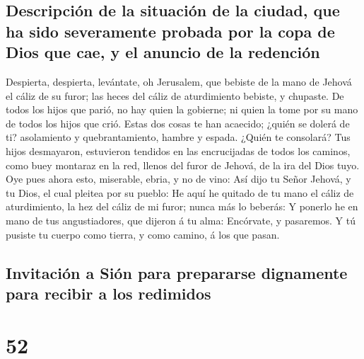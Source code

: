 \hypertarget{descripciuxf3n-de-la-situaciuxf3n-de-la-ciudad-que-ha-sido-severamente-probada-por-la-copa-de-dios-que-cae-y-el-anuncio-de-la-redenciuxf3n}{%
\subsection{Descripción de la situación de la ciudad, que ha sido
severamente probada por la copa de Dios que cae, y el anuncio de la
redención}\label{descripciuxf3n-de-la-situaciuxf3n-de-la-ciudad-que-ha-sido-severamente-probada-por-la-copa-de-dios-que-cae-y-el-anuncio-de-la-redenciuxf3n}}

 Despierta, despierta, levántate, oh Jerusalem, que
bebiste de la mano de Jehová el cáliz de su furor; las heces del cáliz
de aturdimiento bebiste, y chupaste.  De todos los hijos
que parió, no hay quien la gobierne; ni quien la tome por su mano de
todos los hijos que crió.  Estas dos cosas te han
acaecido; ¿quién se dolerá de ti? asolamiento y quebrantamiento, hambre
y espada. ¿Quién te consolará?  Tus hijos desmayaron,
estuvieron tendidos en las encrucijadas de todos los caminos, como buey
montaraz en la red, llenos del furor de Jehová, de la ira del Dios tuyo.
 Oye pues ahora esto, miserable, ebria, y no de vino:
 Así dijo tu Señor Jehová, y tu Dios, el cual pleitea por
su pueblo: He aquí he quitado de tu mano el cáliz de aturdimiento, la
hez del cáliz de mi furor; nunca más lo beberás:  Y
ponerlo he en mano de tus angustiadores, que dijeron á tu alma:
Encórvate, y pasaremos. Y tú pusiste tu cuerpo como tierra, y como
camino, á los que pasan.

\hypertarget{invitaciuxf3n-a-siuxf3n-para-prepararse-dignamente-para-recibir-a-los-redimidos}{%
\subsection{Invitación a Sión para prepararse dignamente para recibir a
los
redimidos}\label{invitaciuxf3n-a-siuxf3n-para-prepararse-dignamente-para-recibir-a-los-redimidos}}

\hypertarget{section-51}{%
\section{52}\label{section-51}}

